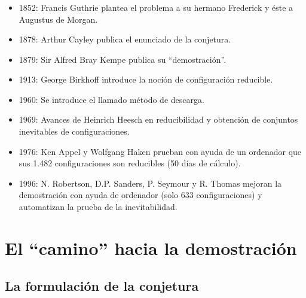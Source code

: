 \documentclass[spanish, utf8,handout]{beamer} %
\theoremstyle{definition}
\begin{document}
\begin{frame}\transblindsvertical
\frametitle{\insertsubsection}

\begin{itemize}
	\item {\color{DarkBlue}1852}: Francis Guthrie plantea el problema a su hermano Frederick y éste a Augustus de Morgan.
	
	\item  {\color{DarkBlue}1878}: Arthur Cayley publica el enunciado de la conjetura.
	
	\item  {\color{DarkBlue}1879}: Sir Alfred Bray Kempe publica su ``demostración''.
	
	\item  {\color{DarkBlue}1913}: George Birkhoff introduce la noción de configuración reducible.
	
	\item  {\color{DarkBlue}1960}: Se introduce el llamado método de descarga.
	
	\item  {\color{DarkBlue}1969}: Avances de Heinrich Heesch en reducibilidad y obtención de conjuntos inevitables de configuraciones.
	
	\item {\color{DarkBlue}1976}: Ken Appel y Wolfgang Haken prueban con ayuda de un ordenador que sus 1.482 configuraciones son reducibles (50 días de cálculo).
	
	\item  {\color{DarkBlue}1996}: N. Robertson, D.P. Sanders, P. Seymour y R. Thomas mejoran la demostración con ayuda de ordenador (solo 633 configuraciones) y automatizan la prueba de la inevitabilidad.
\end{itemize}   
\end{frame}

\section{El ``camino'' hacia la demostración}

\subsection{La formulación de la conjetura}
\end{document}
